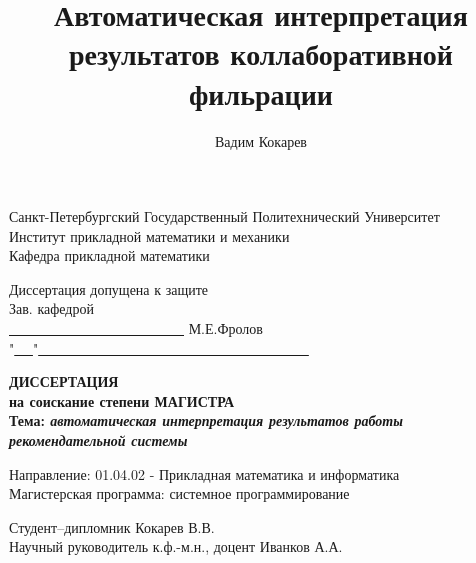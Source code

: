 \documentclass[12pt,a4paper]{report}
\author{Вадим Кокарев}
\title{Автоматическая интерпретация результатов коллаборативной фильрации}
\begin{document}
\begin{titlepage}
\par

\begin{center}
{\large
Санкт-Петербургский Государственный Политехнический Университет\\
Институт прикладной математики и механики\\
Кафедра прикладной математики\\

\vspace*{0.5cm}

\begin{flushright}
Диссертация допущена к защите\\
Зав. кафедрой\ \ \ \ \ \ \ \ \ \ \ \ \ \ \ \ \ \ \ \ \ \ \ \ \ \ \ \\
\underline{ \ \ \ \ \ \ \ \ \ \ \ \ \ \ \ \ \ \ \ \ \ \ \ \ \ } М.Е.Фролов\\
"\underline{ \ \ }"\underline{ \ \ \ \ \ \ \ \ \ \ \ \ \ \ \ \ \ \ \ \ \ \ \ \ \ \ \ \ \ \ \ \ \ \ \ \ \ \ }
\end{flushright}

\vspace*{2.0cm}

{\Large
  \textbf{
    ДИССЕРТАЦИЯ\\
    на соискание степени МАГИСТРА\\
  }
}
\vspace*{1cm}
\textbf{
  Тема: \emph{автоматическая интерпретация результатов работы рекомендательной системы}\\
}

}

\vspace*{1cm}

\begin{flushleft}
Направление: 01.04.02 - Прикладная математика и информатика\\
Магистерская программа: системное программирование\\
\end{flushleft}

\vspace*{0.2cm}

\begin{flushleft}
Студент--дипломник \hrulefill Кокарев В.В.\\
\vspace*{0.3cm}
Научный руководитель к.ф.-м.н., доцент \hrulefill Иванков А.А.\\

\vspace*{0.3cm}
\end{flushleft}
\vspace{0.2em} 


\end{center}
\end{titlepage}
\end{document}
